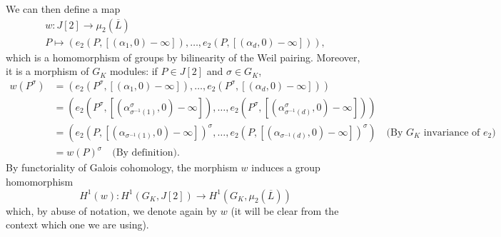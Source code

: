 \documentclass[a4paper, 12pt]{amsart}
\theoremstyle{definition}
\theoremstyle{plain}
\theoremstyle{plain}
\theoremstyle{plain}
\theoremstyle{plain}
\theoremstyle{remark}
\theoremstyle{remark}
\theoremstyle{plain}
\begin{document}
	We can then define a map
	\begin{gather*}
		w:J[2]	\rightarrow\mu_2(\overline{L})\\
		P\mapsto (e_2(P,[(\alpha_1,0)-\infty]),\ldots, e_2(P,[(\alpha_d,0)-\infty])),
	\end{gather*}
	which is a homomorphism of groups by bilinearity of the Weil pairing. Moreover, it is a morphism of $G_K$ modules: if $P\in J[2]$ and $\sigma\in G_K$,
	\begin{align*}
		w(P^\sigma)&=(e_2(P^\sigma,[(\alpha_1,0)-\infty]),\ldots, e_2(P^\sigma,[(\alpha_d,0)-\infty]))\\
		&=(e_2(P^\sigma,[(\alpha^\sigma_{\sigma^{-1}(1)},0)-\infty]),\ldots, e_2(P^\sigma,[(\alpha^\sigma_{\sigma^{-1}(d)},0)-\infty]))\\
		&=(e_2(P,[(\alpha_{\sigma^{-1}(1)},0)-\infty])^\sigma,\ldots, e_2(P,[(\alpha_{\sigma^{-1}(d)},0)-\infty])^\sigma)\quad\text{(By $G_K$ invariance of $e_2$)}\\
		&=w(P)^\sigma\quad\text{(By definition)}.
	\end{align*}
By functoriality of Galois cohomology, the morphism $w$ induces a group homomorphism
\begin{equation*}
	H^1(w):H^1(G_K,J[2])\rightarrow H^1(G_K,\mu_2(\overline{L}))
\end{equation*}
which, by abuse of notation, we denote again by $w$ (it will be clear from the context which one we are using).
\end{document}
